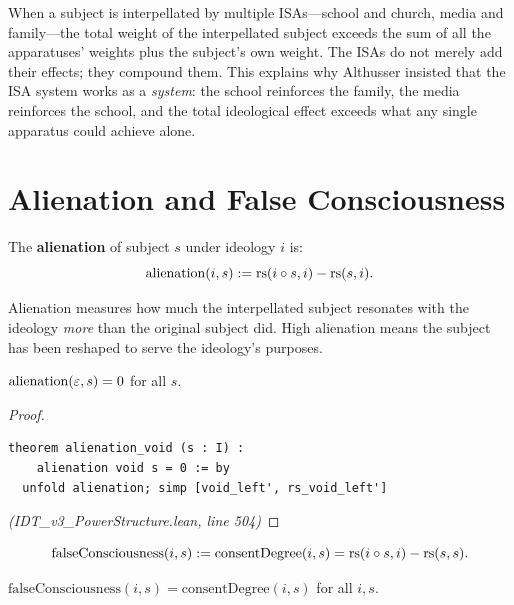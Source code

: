 \begin{interpretation}
When a subject is interpellated by multiple ISAs---school and church, media and
family---the total weight of the interpellated subject exceeds the sum of all
the apparatuses' weights plus the subject's own weight. The ISAs do not merely
add their effects; they compound them. This explains why Althusser insisted that
the ISA system works as a \emph{system}: the school reinforces the family, the
media reinforces the school, and the total ideological effect exceeds what any
single apparatus could achieve alone.
\end{interpretation}

\section{Alienation and False Consciousness}

\begin{definition}[Alienation]
\label{def:alienation}
The \textbf{alienation} of subject $s$ under ideology $i$ is:
\[
  \mathrm{alienation}(i, s) := \mathrm{rs}(i \circ s, i) - \mathrm{rs}(s, i).
\]
\end{definition}

Alienation measures how much the interpellated subject resonates with the
ideology \emph{more} than the original subject did. High alienation means the
subject has been reshaped to serve the ideology's purposes.

\begin{theorem}
\label{thm:alienation-void}
$\mathrm{alienation}(\varepsilon, s) = 0$ for all $s$.
\end{theorem}

\begin{proof}
\begin{lstlisting}
theorem alienation_void (s : I) :
    alienation void s = 0 := by
  unfold alienation; simp [void_left', rs_void_left']
\end{lstlisting}
\textit{(IDT\_v3\_PowerStructure.lean, line 504)}
\end{proof}

\begin{definition}
\label{def:false-consciousness}
\[
  \mathrm{falseConsciousness}(i, s) := \mathrm{consentDegree}(i, s) = \mathrm{rs}(i \circ s, i) - \mathrm{rs}(s, s).
\]
\end{definition}

\begin{theorem}
\label{thm:false-consciousness-consent}
$\mathrm{falseConsciousness}(i, s) = \mathrm{consentDegree}(i, s)$ for all $i, s$.
\end{theorem}

